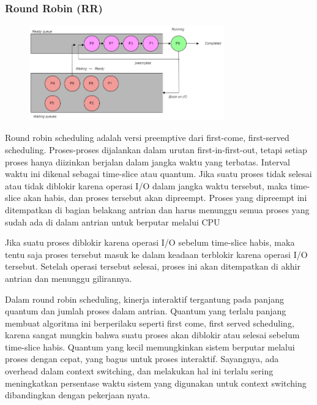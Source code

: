 \documentclass[12pt]{article}
\begin{document}
	\subsubsection{Round Robin (RR)}
        \begin{figure} [h]
        \centering
        \includegraphics[width=0.75\textwidth]{assets/Round Robin Diagram.png}
        \label{fig:diagram}
        \end{figure}
		Round robin scheduling adalah versi preemptive dari first-come, first-served scheduling. Proses-proses dijalankan dalam urutan first-in-first-out, tetapi setiap proses hanya diizinkan berjalan dalam jangka waktu yang terbatas. Interval waktu ini dikenal sebagai time-slice atau quantum. Jika suatu proses tidak selesai atau tidak diblokir karena operasi I/O dalam jangka waktu tersebut, maka time-slice akan habis, dan proses tersebut akan dipreempt. Proses yang dipreempt ini ditempatkan di bagian belakang antrian dan harus menunggu semua proses yang sudah ada di dalam antrian untuk berputar melalui CPU
		\par Jika suatu proses diblokir karena operasi I/O sebelum time-slice habis, maka tentu saja proses tersebut masuk ke dalam keadaan terblokir karena operasi I/O tersebut. Setelah operasi tersebut selesai, proses ini akan ditempatkan di akhir antrian dan menunggu gilirannya.
		\par Dalam round robin scheduling, kinerja interaktif tergantung pada panjang quantum dan jumlah proses dalam antrian. Quantum yang terlalu panjang membuat algoritma ini berperilaku seperti first come, first served scheduling, karena sangat mungkin bahwa suatu proses akan diblokir atau selesai sebelum time-slice habis. Quantum yang kecil memungkinkan sistem berputar melalui proses dengan cepat, yang bagus untuk proses interaktif. Sayangnya, ada overhead dalam context switching, dan melakukan hal ini terlalu sering meningkatkan persentase waktu sistem yang digunakan untuk context switching dibandingkan dengan pekerjaan nyata.
		
\end{document}
